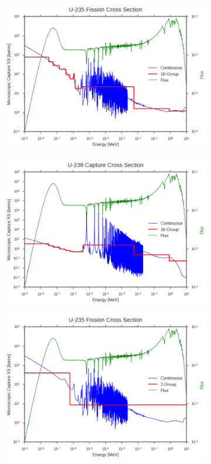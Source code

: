 \begin{figure}
\begin{subfigure}{.5\textwidth}
  \includegraphics[width=\linewidth]{figures/intro/u235-fission-16}
  \caption{}
  \label{fig:assm-unique-neighbors}
\end{subfigure}
\begin{subfigure}{.5\textwidth}
  \centering
  \includegraphics[width=\linewidth]{figures/intro/u238-capture-16}
  \caption{}
  \label{fig:colorset-unique-neighbors}
\end{subfigure}
\begin{subfigure}{.5\textwidth}
  \centering
  \includegraphics[width=\linewidth]{figures/intro/u235-fission-2}

\end{subfigure}
\end{figure}
